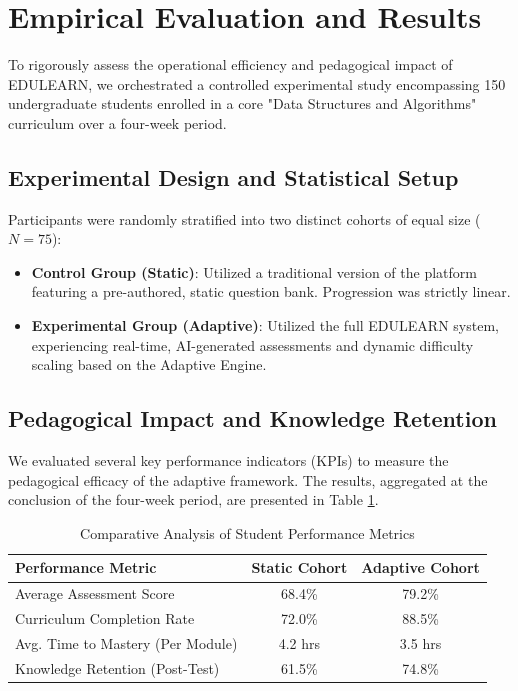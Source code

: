 \documentclass[conference]{IEEEtran}
\begin{document}
\section{Empirical Evaluation and Results}

To rigorously assess the operational efficiency and pedagogical impact of EDULEARN, we orchestrated a controlled experimental study encompassing 150 undergraduate students enrolled in a core "Data Structures and Algorithms" curriculum over a four-week period.

\subsection{Experimental Design and Statistical Setup}
Participants were randomly stratified into two distinct cohorts of equal size ($N=75$):
\begin{itemize}
    \item \textbf{Control Group (Static)}: Utilized a traditional version of the platform featuring a pre-authored, static question bank. Progression was strictly linear.
    \item \textbf{Experimental Group (Adaptive)}: Utilized the full EDULEARN system, experiencing real-time, AI-generated assessments and dynamic difficulty scaling based on the Adaptive Engine.
\end{itemize}

\subsection{Pedagogical Impact and Knowledge Retention}
We evaluated several key performance indicators (KPIs) to measure the pedagogical efficacy of the adaptive framework. The results, aggregated at the conclusion of the four-week period, are presented in Table \ref{tab:performance}.

\begin{table}[htbp]
\caption{Comparative Analysis of Student Performance Metrics}
\begin{center}
\begin{tabular}{@{}lcc@{}}
\toprule
\textbf{Performance Metric} & \textbf{Static Cohort} & \textbf{Adaptive Cohort} \\
\midrule
Average Assessment Score & 68.4\% & 79.2\% \\
Curriculum Completion Rate & 72.0\% & 88.5\% \\
Avg. Time to Mastery (Per Module) & 4.2 hrs & 3.5 hrs \\
Knowledge Retention (Post-Test) & 61.5\% & 74.8\% \\
\bottomrule
\end{tabular}
\label{tab:performance}
\end{center}
\end{table}
\end{document}
